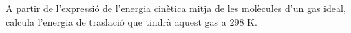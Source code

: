 \begin{exr}
A partir de l'expressió de l'energia cinètica mitja de les molècules d'un gas ideal, calcula l'energia de traslació que tindrà aquest gas a 298 K.
\end{exr}